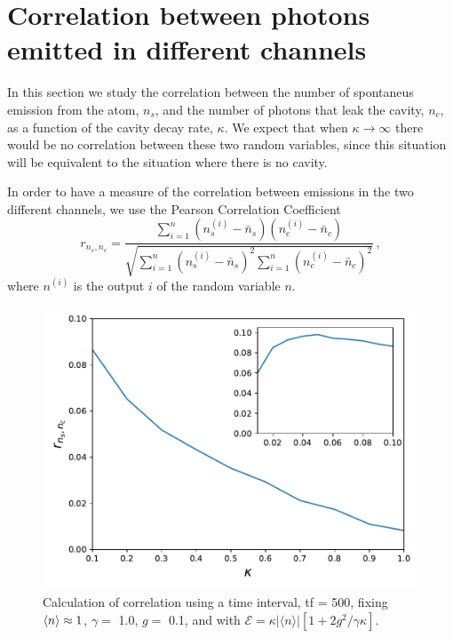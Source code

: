 \documentclass[%
 reprint,
 amsmath,amssymb,
 aps, 
]{revtex4-2}
\begin{document}
\section{Correlation between photons emitted in different channels}\label{sc:correlation}
In this section we study the correlation between the number of
spontaneus emission from the atom, $n_s$, and the number of photons
that leak the cavity, $n_c$, as a function of the cavity decay rate,
$\kappa$. We expect that when $\kappa\rightarrow\infty$ there would be
no correlation between these two random variables, since this
situation will be equivalent to the situation where there is no
cavity.

In order to have a measure of the correlation between emissions in the
two different channels, we use the Pearson Correlation Coefficient
\cite{benesty2009pearson}
\begin{equation} 
r_{n_s,n_c} = \frac{\sum\limits_{i=1}^n(n_s^{(i)} -
  \bar{n}_s)(n_c^{(i)} - \bar{n}_c)}{\sqrt{\sum\limits_{i=1}^n(n_s^{(i)}
    - \bar{n}_s)^2\sum\limits_{i=1}^n(n_c^{(i)} - \bar{n}_c)^2}}\, ,  \label{correlationc}
\end{equation}
where $n^{(i)}$ is the output $i$ of the random variable $n$.

\begin{center}
\begin{figure}[t!]
\begin{center}
\includegraphics[scale = 0.5]{million1.pdf}
\caption{\small{Calculation of correlation using a time interval, tf = 500, fixing $\expval{n} \approx 1$, $\gamma =$ 1.0, $g = $ 0.1, and with  $\mathcal{E} =  \kappa |\langle n \rangle|[1 + 2g^2/\gamma \kappa]$.}} \label{corrxy}
\end{center}  
\end{figure}
\end{center}
\end{document}

